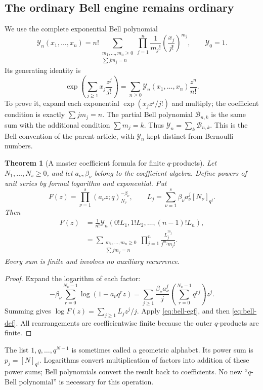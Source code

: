 \documentclass[11pt,a4paper]{article}
\numberwithin{equation}{section}
\newtheorem{theorem}{Theorem}[section]
\theoremstyle{definition}
\theoremstyle{remark}
\newcommand{\coef}[2]{[#1^{#2}]}
\newcommand{\Bcal}{\mathcal B}
\newcommand{\Y}{\mathcal Y}
\begin{document}
\subsection{The ordinary Bell engine remains ordinary}
We use the complete exponential Bell polynomial
\begin{equation}
 \Y_n(x_1,\ldots,x_n)
 =n!\!\sum_{\substack{m_1,\ldots,m_n\ge0\\\sum j m_j=n}}
       \prod_{j=1}^n\frac1{m_j!}\left(\frac{x_j}{j!}\right)^{m_j},
 \qquad \Y_0=1.
 \label{eq:bell-def}
\end{equation}
Its generating identity is
\begin{equation}
 \exp\!\left(\sum_{j\ge1}x_j\frac{z^j}{j!}\right)
 =\sum_{n\ge0}\Y_n(x_1,\ldots,x_n)\frac{z^n}{n!}.
 \label{eq:bell-egf}
\end{equation}
To prove it, expand each exponential
$\exp(x_jz^j/j!)$ and multiply; the coefficient condition is exactly
$\sum j m_j=n$. The partial Bell polynomial $\Bcal_{n,k}$ is the same
sum with the additional condition $\sum m_j=k$. Thus
$\Y_n=\sum_k\Bcal_{n,k}$. This is the Bell convention of the parent
article, with $\Y_n$ kept distinct from Bernoulli numbers.

\begin{theorem}[A master coefficient formula for finite $q$-products]
\label{thm:bell-product}
Let $N_1,\ldots,N_s\ge0$, and let $a_\nu,\beta_\nu$ belong to the
coefficient algebra. Define powers of unit series by formal logarithm
and exponential. Put
\begin{equation}
 F(z)=\prod_{\nu=1}^s(a_\nu z;q)_{N_\nu}^{-\beta_\nu},\qquad
 L_j=\sum_{\nu=1}^s\beta_\nu a_\nu^j[N_\nu]_{q^j}.
 \label{eq:Lj}
\end{equation}
Then
\begin{align}
 \coef zn F(z)
 &=\frac1{n!}\Y_n(0!L_1,1!L_2,\ldots,(n-1)!L_n),
 \label{eq:bell-product}\\
 &=\sum_{\substack{m_1,\ldots,m_n\ge0\\\sum j m_j=n}}
       \prod_{j=1}^n\frac{L_j^{m_j}}{j^{m_j}m_j!}.
 \label{eq:bell-product-explicit}
\end{align}
Every sum is finite and involves no auxiliary recurrence.
\end{theorem}
\begin{proof}
Expand the logarithm of each factor:
\[
 -\beta_\nu\sum_{r=0}^{N_\nu-1}\log(1-a_\nu q^rz)
 =\sum_{j\ge1}\frac{\beta_\nu a_\nu^j}{j}
      \left(\sum_{r=0}^{N_\nu-1}q^{rj}\right)z^j.
\]
Summing gives $\log F(z)=\sum_{j\ge1}L_jz^j/j$. Apply
\cref{eq:bell-egf}, and then \cref{eq:bell-def}. All rearrangements
are coefficientwise finite because the outer $q$-products are finite.
\end{proof}
The list $1,q,\ldots,q^{N-1}$ is sometimes called a geometric alphabet.
Its power sum is $p_j=[N]_{q^j}$. Logarithms convert multiplication of
factors into addition of these power sums; Bell polynomials convert the
result back to coefficients. No new ``$q$-Bell polynomial'' is necessary
for this operation.
\end{document}
